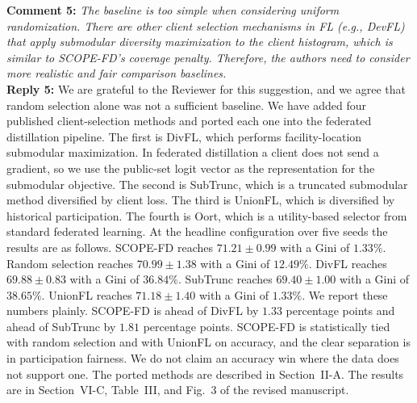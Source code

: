 \documentclass[10pt]{article}
\begin{document}
\noindent
\textbf{Comment 5:} \textit{The baseline is too simple when considering uniform randomization. There are other client selection mechanisms in FL (e.g., DevFL) that apply submodular diversity maximization to the client histogram, which is similar to SCOPE-FD's coverage penalty. Therefore, the authors need to consider more realistic and fair comparison baselines.} \\
\noindent
\textbf{Reply 5:} {We are grateful to the Reviewer for this suggestion, and we agree that random selection alone was not a sufficient baseline. We have added four published client-selection methods and ported each one into the federated distillation pipeline. The first is DivFL, which performs facility-location submodular maximization. In federated distillation a client does not send a gradient, so we use the public-set logit vector as the representation for the submodular objective. The second is SubTrunc, which is a truncated submodular method diversified by client loss. The third is UnionFL, which is diversified by historical participation. The fourth is Oort, which is a utility-based selector from standard federated learning. At the headline configuration over five seeds the results are as follows. SCOPE-FD reaches $71.21 \pm 0.99$ with a Gini of $1.33\%$. Random selection reaches $70.99 \pm 1.38$ with a Gini of $12.49\%$. DivFL reaches $69.88 \pm 0.83$ with a Gini of $36.84\%$. SubTrunc reaches $69.40 \pm 1.00$ with a Gini of $38.65\%$. UnionFL reaches $71.18 \pm 1.40$ with a Gini of $1.33\%$. We report these numbers plainly. SCOPE-FD is ahead of DivFL by $1.33$ percentage points and ahead of SubTrunc by $1.81$ percentage points. SCOPE-FD is statistically tied with random selection and with UnionFL on accuracy, and the clear separation is in participation fairness. We do not claim an accuracy win where the data does not support one. The ported methods are described in Section~II-A. The results are in Section~VI-C, Table~III, and Fig.~3 of the revised manuscript.}\\
\end{document}
